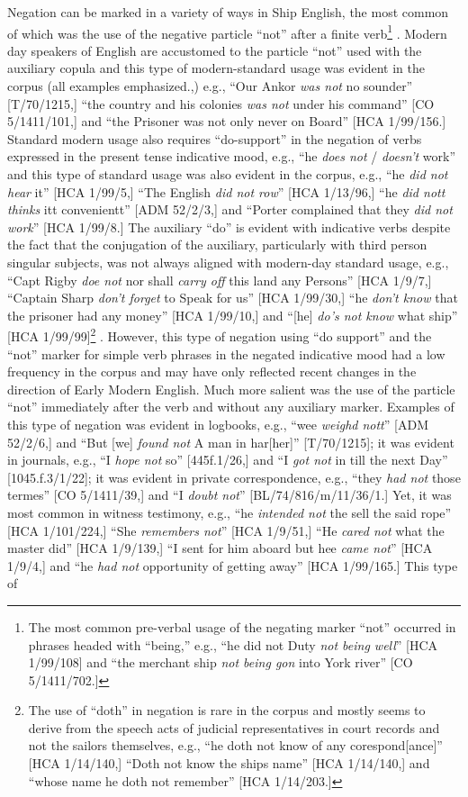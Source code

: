   Negation can be marked in a variety of ways in Ship English, the most common of which was the use of the negative particle “not” after a finite verb\footnote{The most common pre-verbal usage of the negating marker “not” occurred in phrases headed with “being,” e.g., “he did not Duty \textit{not being well}” [HCA 1/99/108] and “the merchant ship \textit{not being gon} into York river” [CO 5/1411/702.]} . Modern day speakers of English are accustomed to the particle “not” used with the auxiliary copula and this type of modern-standard usage was evident in the corpus (all examples emphasized.,) e.g., “Our Ankor \textit{was not} no sounder” [T/70/1215,] “the country and his colonies \textit{was not} under his command” [CO 5/1411/101,] and “the Prisoner was not only never on Board” [HCA 1/99/156.] Standard modern usage also requires “do-support” in the negation of verbs expressed in the present tense indicative mood, e.g., “he \textit{does not} / \textit{doesn’t} work” and this type of standard usage was also evident in the corpus, e.g., “he \textit{did not hear} it” [HCA 1/99/5,] “The English \textit{did not row}” [HCA 1/13/96,] “he \textit{did nott} \textit{thinks} itt convenientt” [ADM 52/2/3,] and “Porter complained that they \textit{did not work}” [HCA 1/99/8.] The auxiliary “do” is evident with indicative verbs despite the fact that the conjugation of the auxiliary, particularly with third person singular subjects, was not always aligned with modern-day standard usage, e.g., “Capt Rigby \textit{doe not} nor shall \textit{carry off} this land any Persons” [HCA 1/9/7,] “Captain Sharp \textit{don’t forget} to Speak for us” [HCA 1/99/30,] “he \textit{don’t know} that the prisoner had any money” [HCA 1/99/10,] and “[he] \textit{do’s not know} what ship” [HCA 1/99/99]\footnote{The use of “doth” in negation is rare in the corpus and mostly seems to derive from the speech acts of judicial representatives in court records and not the sailors themselves, e.g., “he doth not know of any corespond[ance]” [HCA 1/14/140,] “Doth not know the ships name” [HCA 1/14/140,] and “whose name he doth not remember” [HCA 1/14/203.]} . However, this type of negation using “do support” and the “not” marker for simple verb phrases in the negated indicative mood had a low frequency in the corpus and may have only reflected recent changes in the direction of Early Modern English. Much more salient was the use of the particle “not” immediately after the verb and without any auxiliary marker. Examples of this type of negation was evident in logbooks, e.g., “wee \textit{weighd nott}” [ADM 52/2/6,] and “But [we] \textit{found not} A man in har[her]” [T/70/1215]; it was evident in journals, e.g., “I \textit{hope not} so” [445f.1/26,] and “I \textit{got not} in till the next Day” [1045.f.3/1/22]; it was evident in private correspondence, e.g., “they \textit{had not} those termes” [CO 5/1411/39,] and “I \textit{doubt not}” [BL/74/816/m/11/36/1.] Yet, it was most common in witness testimony, e.g., “he \textit{intended not} the sell the said rope” [HCA 1/101/224,] “She \textit{remembers not}” [HCA 1/9/51,] “He \textit{cared not} what the master did” [HCA 1/9/139,] “I sent for him aboard but hee \textit{came not}” [HCA 1/9/4,] and “he \textit{had not} opportunity of getting away” [HCA 1/99/165.] This type of 